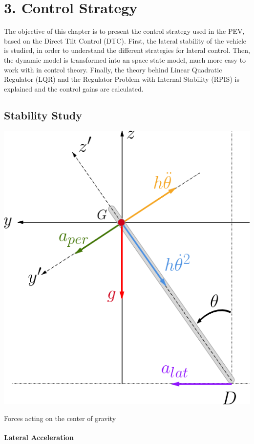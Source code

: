 \chapter{3. Control Strategy}

The objective of this chapter is to present the control strategy used in the PEV, based on the Direct Tilt Control (DTC). First, the lateral stability of the vehicle is studied, in order to understand the different strategies for lateral control. Then, the dynamic model is transformed into an space state model, much more easy to work with in control theory. Finally, the theory behind Linear Quadratic Regulator (LQR) and the Regulator Problem with Internal Stability (RPIS) is explained and the control gains are calculated.

\section{Stability Study}
\begin{marginfigure}[10cm]
	\includegraphics[width=1.2\linewidth]{figs/03/yz2}
	\caption{Forces acting on the center of gravity}
	\label{yz2}
\end{marginfigure}
\subsubsection{\textbf{Lateral Acceleration}}

